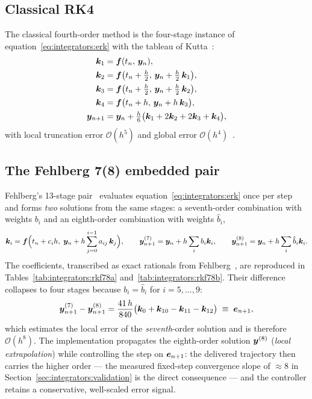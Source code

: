 \subsection{Classical RK4}

The classical fourth-order method is the four-stage instance of
equation~\eqref{eq:integrators:erk} with the tableau of
Kutta~\cite{hairer1993}:
\begin{equation}
  \begin{aligned}
    \bm{k}_1 &= \bm{f}(t_n,\, \bm{y}_n), \\
    \bm{k}_2 &= \bm{f}\bigl(t_n + \tfrac{h}{2},\,
      \bm{y}_n + \tfrac{h}{2}\,\bm{k}_1\bigr), \\
    \bm{k}_3 &= \bm{f}\bigl(t_n + \tfrac{h}{2},\,
      \bm{y}_n + \tfrac{h}{2}\,\bm{k}_2\bigr), \\
    \bm{k}_4 &= \bm{f}\bigl(t_n + h,\, \bm{y}_n + h\,\bm{k}_3\bigr), \\
    \bm{y}_{n+1} &= \bm{y}_n
      + \tfrac{h}{6}\bigl(\bm{k}_1 + 2\bm{k}_2 + 2\bm{k}_3 + \bm{k}_4\bigr),
  \end{aligned}
  \label{eq:integrators:rk4}
\end{equation}
with local truncation error $\mathcal{O}(h^{5})$ and global error
$\mathcal{O}(h^{4})$~\cite{hairer1993}.

\subsection{The Fehlberg 7(8) embedded pair}

Fehlberg's 13-stage pair~\cite{fehlberg1968} evaluates
equation~\eqref{eq:integrators:erk} once per step and forms \emph{two}
solutions from the same stages: a seventh-order combination with weights
$b_i$ and an eighth-order combination with weights $\hat{b}_i$,
\begin{equation}
  \bm{k}_i = \bm{f}\Bigl(t_n + c_i h,\;
    \bm{y}_n + h \sum_{j=0}^{i-1} a_{ij}\, \bm{k}_j\Bigr),
  \qquad
  \bm{y}^{(7)}_{n+1} = \bm{y}_n + h \sum_i b_i \bm{k}_i,
  \qquad
  \bm{y}^{(8)}_{n+1} = \bm{y}_n + h \sum_i \hat{b}_i \bm{k}_i.
  \label{eq:integrators:rkf78:stages}
\end{equation}
The coefficients, transcribed as exact rationals from
Fehlberg~\cite{fehlberg1968}, are reproduced in
Tables~\ref{tab:integrators:rkf78a} and~\ref{tab:integrators:rkf78b}. Their
difference collapses to four stages because $b_i = \hat{b}_i$ for
$i = 5, \dots, 9$:
\begin{equation}
  \bm{y}^{(7)}_{n+1} - \bm{y}^{(8)}_{n+1}
    = \frac{41\,h}{840}
      \bigl(\bm{k}_0 + \bm{k}_{10} - \bm{k}_{11} - \bm{k}_{12}\bigr)
    \;\equiv\; \bm{e}_{n+1},
  \label{eq:integrators:rkf78:err}
\end{equation}
which estimates the local error of the \emph{seventh}-order solution and is
therefore $\mathcal{O}(h^{8})$. The implementation propagates the
eighth-order solution $\bm{y}^{(8)}$ (\emph{local extrapolation}) while
controlling the step on $\bm{e}_{n+1}$: the delivered trajectory then
carries the higher order --- the measured fixed-step convergence slope of
$\approx 8$ in Section~\ref{sec:integrators:validation} is the direct
consequence --- and the controller retains a conservative, well-scaled
error signal.


